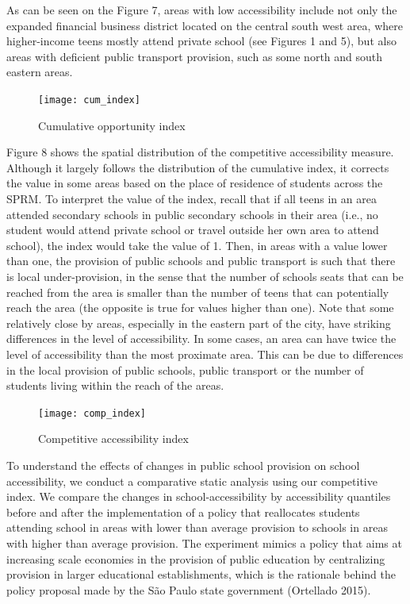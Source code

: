 \documentclass[]{article}
\begin{document}
As can be seen on the Figure 7, areas with low accessibility include not
only the expanded financial business district located on the central
south west area, where higher-income teens mostly attend private school
(see Figures 1 and 5), but also areas with deficient public transport
provision, such as some north and south eastern areas.

\begin{figure}
\texttt{[image: cum\_index]} \caption{Cumulative opportunity index}\label{fig:unnamed-chunk-8}
\end{figure}

Figure 8 shows the spatial distribution of the competitive accessibility
measure. Although it largely follows the distribution of the cumulative
index, it corrects the value in some areas based on the place of
residence of students across the SPRM. To interpret the value of the
index, recall that if all teens in an area attended secondary schools in
public secondary schools in their area (i.e., no student would attend
private school or travel outside her own area to attend school), the
index would take the value of 1. Then, in areas with a value lower than
one, the provision of public schools and public transport is such that
there is local under-provision, in the sense that the number of schools
seats that can be reached from the area is smaller than the number of
teens that can potentially reach the area (the opposite is true for
values higher than one). Note that some relatively close by areas,
especially in the eastern part of the city, have striking differences in
the level of accessibility. In some cases, an area can have twice the
level of accessibility than the most proximate area. This can be due to
differences in the local provision of public schools, public transport
or the number of students living within the reach of the areas.
\begin{figure}
\texttt{[image: comp\_index]} \caption{Competitive accessibility index}\label{fig:unnamed-chunk-9}
\end{figure}
To understand the effects of changes in public school provision on
school accessibility, we conduct a comparative static analysis using our
competitive index. We compare the changes in school-accessibility by
accessibility quantiles before and after the implementation of a policy
that reallocates students attending school in areas with lower than
average provision to schools in areas with higher than average
provision. The experiment mimics a policy that aims at increasing scale
economies in the provision of public education by centralizing provision
in larger educational establishments, which is the rationale behind the
policy proposal made by the São Paulo state government (Ortellado 2015).
\end{document}
